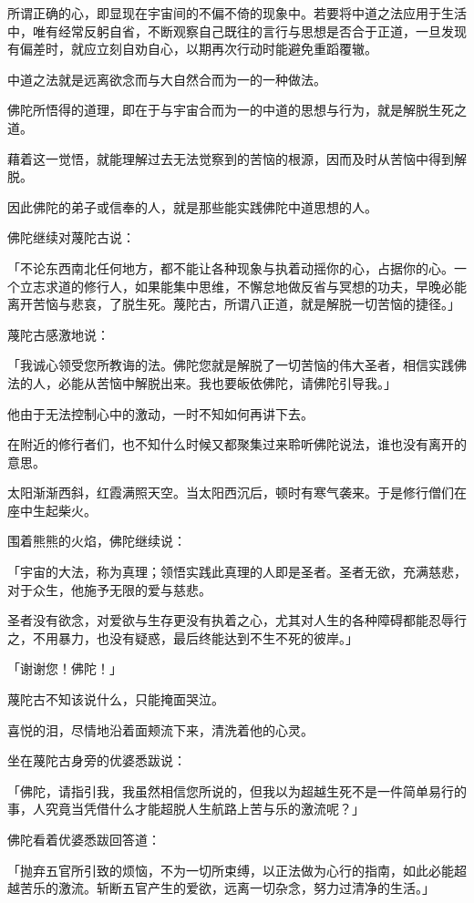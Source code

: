 \documentclass[twoside,openany]{book}
\begin{document}
所谓正确的心，即显现在宇宙间的不偏不倚的现象中。若要将中道之法应用于生活中，唯有经常反躬自省，不断观察自己既往的言行与思想是否合于正道，一旦发现有偏差时，就应立刻自劝自心，以期再次行动时能避免重蹈覆辙。

中道之法就是远离欲念而与大自然合而为一的一种做法。

佛陀所悟得的道理，即在于与宇宙合而为一的中道的思想与行为，就是解脱生死之道。

藉着这一觉悟，就能理解过去无法觉察到的苦恼的根源，因而及时从苦恼中得到解脱。

因此佛陀的弟子或信奉的人，就是那些能实践佛陀中道思想的人。

佛陀继续对蔑陀古说：

「不论东西南北任何地方，都不能让各种现象与执着动摇你的心，占据你的心。一个立志求道的修行人，如果能集中思维，不懈怠地做反省与冥想的功夫，早晚必能离开苦恼与悲哀，了脱生死。蔑陀古，所谓八正道，就是解脱一切苦恼的捷径。」

蔑陀古感激地说：

「我诚心领受您所教诲的法。佛陀您就是解脱了一切苦恼的伟大圣者，相信实践佛法的人，必能从苦恼中解脱出来。我也要皈依佛陀，请佛陀引导我。」

他由于无法控制心中的激动，一时不知如何再讲下去。

在附近的修行者们，也不知什么时候又都聚集过来聆听佛陀说法，谁也没有离开的意思。

太阳渐渐西斜，红霞满照天空。当太阳西沉后，顿时有寒气袭来。于是修行僧们在座中生起柴火。

围着熊熊的火焰，佛陀继续说：

「宇宙的大法，称为真理；领悟实践此真理的人即是圣者。圣者无欲，充满慈悲，对于众生，他施予无限的爱与慈悲。

圣者没有欲念，对爱欲与生存更没有执着之心，尤其对人生的各种障碍都能忍辱行之，不用暴力，也没有疑惑，最后终能达到不生不死的彼岸。」

「谢谢您！佛陀！」

蔑陀古不知该说什么，只能掩面哭泣。

喜悦的泪，尽情地沿着面颊流下来，清洗着他的心灵。

坐在蔑陀古身旁的优婆悉跋说：

「佛陀，请指引我，我虽然相信您所说的，但我以为超越生死不是一件简单易行的事，人究竟当凭借什么才能超脱人生航路上苦与乐的激流呢？」

佛陀看着优婆悉跋回答道：

「抛弃五官所引致的烦恼，不为一切所束缚，以正法做为心行的指南，如此必能超越苦乐的激流。斩断五官产生的爱欲，远离一切杂念，努力过清净的生活。」
\end{document}
